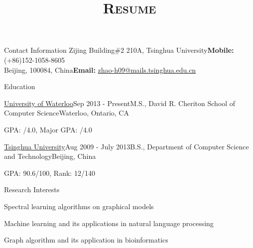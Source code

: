 \documentclass{resume} %
\title{\textsc{Resume}}
\begin{document}
\begin{rSection}{Contact Information}
Zijing Building\#2 210A, Tsinghua University\hfill\textbf{Mobile:} (+86)152-1058-8605\\
Beijing, 100084, China\hfill\textbf{Email:} \href{mailto:zhao-h09@mail.tsinghua.edu.cn}{zhao-h09@mails.tsinghua.edu.cn}\\
\end{rSection}

\begin{rSection}{Education}
\begin{rSubsection}{\href{https://uwaterloo.ca/}{University of Waterloo}}{Sep 2013 - Present}{M.S., David R. Cheriton School of Computer Science}{Waterloo, Ontario, CA}
\item{GPA: /4.0, Major GPA: /4.0}
\end{rSubsection}
\begin{rSubsection}{\href{http://www.tsinghua.edu.cn/publish/th/index.html}{Tsinghua University}}{Aug 2009 - July 2013}{B.S., Department of Computer Science and Technology}{Beijing, China}
\item{GPA: 90.6/100, Rank: 12/140}
\end{rSubsection}

\end{rSection}
\begin{rSection}{Research Interests}
\item{}Spectral learning algorithms on graphical models
\item{}Machine learning and its applications in natural language processing
\item{}Graph algorithm and its application in bioinformatics
\end{rSection}
\end{document}
